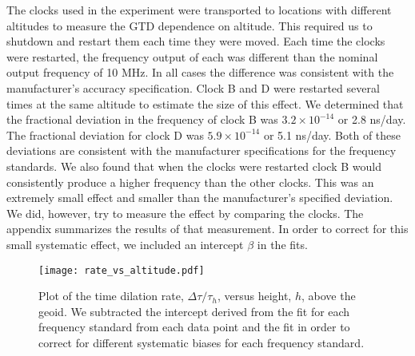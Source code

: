 \documentclass[prb,preprint]{revtex4-1}
\begin{document}
The clocks used in the experiment were transported to locations with different altitudes to measure the GTD dependence on altitude. This required us to shutdown and restart them each time they were moved. Each time the clocks were restarted, the frequency output of each was different than the nominal output frequency of 10 MHz. In all cases the difference was consistent with the manufacturer's accuracy specification. Clock B and D were restarted several times at the same altitude to estimate the size of this effect. We determined that the fractional deviation in the frequency of clock B was $3.2 \times 10^{-14}$  or 2.8 ns/day. The fractional deviation for clock D was $5.9 \times 10^{-14}$ or 5.1 ns/day. Both of these deviations are consistent with the manufacturer specifications for the frequency standards.\cite{5017Adatasheet} We also found that when the clocks were restarted clock B would consistently produce a higher frequency than the other clocks. This was an extremely small effect and smaller than the manufacturer's specified deviation. We did, however, try to measure the effect by comparing the clocks. The appendix summarizes the results of that measurement. In order to correct for this small systematic effect, we included an intercept $\beta$ in the fits. 
\begin{figure}[ht!]
\centering
\texttt{[image: rate\_vs\_altitude.pdf]}
\caption{Plot of the time dilation rate, $\Delta \tau/\tau_h$, versus height, $h$, above the geoid. We subtracted the intercept derived from the fit for each frequency standard from each data point and the fit in order to correct for different systematic biases for each frequency standard.}
\label{fig:rate_vs_altitude}
\end{figure}
\end{document}
